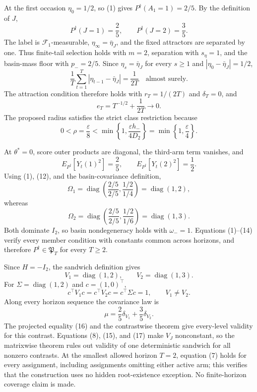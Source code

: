 At the first occasion \(\eta_0=1/2\), so (1) gives
\(P^\dagger(A_1=1)=2/5\).  By the definition of \(J\),
\[
 P^\dagger(J=1)=\frac25,
 \qquad P^\dagger(J=2)=\frac35.
\tag{8}
\]
The label is \(\mathcal F_1\)-measurable,
\(\eta_\infty=\bar\eta_J\), and the fixed attractors are separated by one.
Thus finite-tail selection holds with \(m=2\), separation with \(s_\eta=1\),
and the basin-mass floor with \(p_-=2/5\).  Since \(\eta_s=\bar\eta_J\) for
every \(s\ge1\) and \(|\eta_0-\bar\eta_J|=1/2\),
\[
 \frac1T\sum_{t=1}^T|\eta_{t-1}-\bar\eta_J|=\frac1{2T}
 \quad\text{almost surely}.
\tag{9}
\]
The attraction condition therefore holds with \(r_T=1/(2T)\) and
\(\delta_T=0\), and
\[
 e_T=T^{-1/2}+\frac1{2T}\longrightarrow0.
\tag{10}
\]
The proposed radius satisfies the strict class restriction because
\[
 0<\rho=\frac\varepsilon8
 <\min\left\{1,\frac{\varepsilon h_-}{4D_2}\right\}
 =\min\left\{1,\frac\varepsilon4\right\}.
\tag{11}
\]

At \(\theta^*=0\), score outer products are diagonal, the third-arm term
vanishes, and
\[
 E_{P^\dagger}[Y_t(1)^2]=\frac25,
 \qquad E_{P^\dagger}[Y_t(2)^2]=\frac12.
\tag{12}
\]
Using (1), (12), and the basin-covariance definition,
\[
 \Omega_1=\operatorname{diag}\left(\frac{2/5}{2/5},
 \frac{1/2}{1/4}\right)=\operatorname{diag}(1,2),
\tag{13}
\]
whereas
\[
 \Omega_2=\operatorname{diag}\left(\frac{2/5}{2/5},
 \frac{1/2}{1/6}\right)=\operatorname{diag}(1,3).
\tag{14}
\]
Both dominate \(I_2\), so basin nondegeneracy holds with \(\omega_-=1\).
Equations (1)--(14) verify every member condition with constants common across
horizons, and therefore \(P^\dagger\in\mathfrak P_T\) for every \(T\ge2\).

Since \(H=-I_2\), the sandwich definition gives
\[
 V_1=\operatorname{diag}(1,2),
 \qquad V_2=\operatorname{diag}(1,3).
\tag{15}
\]
For \(\Sigma=\operatorname{diag}(1,2)\) and \(c=(1,0)^\top\),
\[
 c^\top V_1c=c^\top V_2c=c^\top\Sigma c=1,
 \qquad V_1\ne V_2.
\tag{16}
\]
Along every horizon sequence the covariance law is
\[
 \mu=\frac25\delta_{V_1}+\frac35\delta_{V_2}.
\tag{17}
\]
The projected equality (16) and the contrastwise theorem give every-level
validity for this contrast.  Equations (8), (15), and (17) make \(V_J\)
nonconstant, so the matrixwise theorem rules out validity of one deterministic
sandwich for all nonzero contrasts.  At the smallest allowed horizon
\(T=2\), equation (7) holds for every assignment, including assignments
omitting either active arm; this verifies that the construction uses no
hidden root-existence exception.  No finite-horizon coverage claim is made.